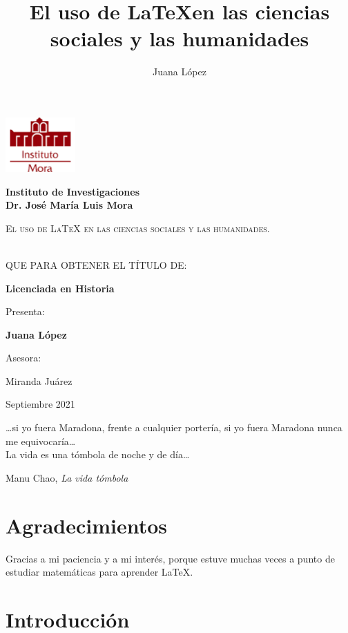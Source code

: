 \documentclass[12pt,letterpaper,oneside]{report}
\title{El uso de \LaTeX en las ciencias sociales y las humanidades}
\author{Juana López}
\date{} %
\begin{document}
	\begin{titlepage}
		\centering
		{\includegraphics[width=0.2\textwidth]{escudo}\par}
		\vspace{1cm}
		{\bfseries\LARGE Instituto de Investigaciones\\Dr. José María Luis Mora \par}
		\vspace{1cm}
		{\scshape\LARGE El uso de \LaTeX {} en las ciencias sociales y las humanidades. \par}
		\vspace{2cm}
		\\[8pt]
	QUE PARA OBTENER EL TÍTULO DE:\\[5pt]
	{\bfseries\Large Licenciada en Historia \par}
	\vspace{2cm}
		{\Large Presenta: \par}
		{\Large \textbf{Juana López} \par}
		\vfill
		{Asesora: \par}
		{ Miranda Juárez \par}
		\vfill
		
		{Septiembre 2021 \par}
		\end{titlepage}

\thispagestyle{empty}
\vspace*{\fill}
\epigraph{\dots si yo fuera Maradona, frente a cualquier portería, si yo fuera Maradona nunca me equivocaría\dots\\ La vida es una tómbola de noche y de día\dots}{\textemdash Manu Chao, \textit{La vida tómbola}}


\thispagestyle{empty}


\chapter*{Agradecimientos}
Gracias a mi paciencia y a mi interés, porque estuve muchas veces a punto de estudiar matemáticas para aprender \LaTeX.


\tableofcontents

\chapter{Introducción}
\end{document}
